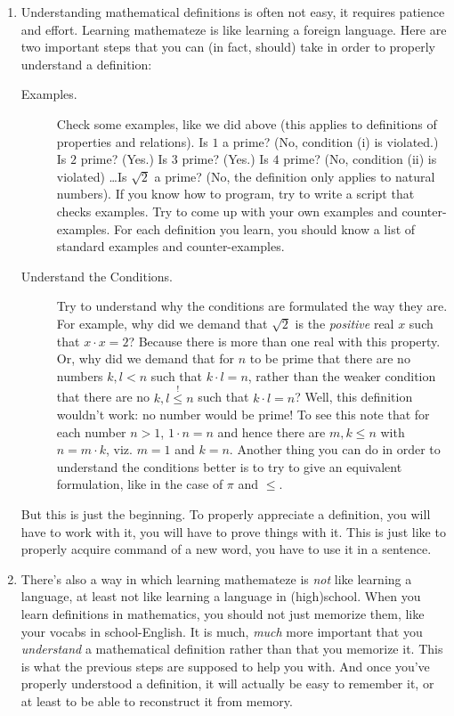 \begin{enumerate}[{\thesection}.1]
		\item Understanding mathematical definitions is often not easy, it requires patience and effort. Learning mathemateze is like learning a foreign language. Here are two important steps that you can (in fact, should) take in order to properly understand a definition:

		\begin{description}
		
			\item[Examples.] Check some examples, like we did above (this applies to definitions of properties and relations). Is $1$ a prime? (No, condition (i) is violated.) Is $2$ prime? (Yes.) Is $3$ prime? (Yes.) Is $4$ prime? (No, condition (ii) is violated) \dots Is $\sqrt{2}$ a prime? (No, the definition only applies to natural numbers). If you know how to program, try to write a script that checks examples. Try to come up with your own examples and counter-examples. For each definition you learn, you should know a list of standard examples and counter-examples.

			\item[Understand the Conditions.] Try to understand why the conditions are formulated the way they are. For example, why did we demand that $\sqrt{2}$ is the \emph{positive} real $x$ such that $x\cdot x=2$? Because there is more than one real with this property. Or, why did we demand that for $n$ to be prime that there are no numbers $k,l<n$ such that $k\cdot l=n$, rather than the weaker condition that there are no $k,l\overset{!}{\leq} n$ such that $k\cdot l=n$? Well, this definition wouldn't work: no number would be prime! To see this note that for each number $n>1$, $1\cdot n=n$ and hence there are $m,k\leq n$ with $n=m\cdot k$, viz. $m=1$ and $k=n$. Another thing you can do in order to understand the conditions better is to try to give an equivalent formulation, like in the case of $\pi$ and $\leq$. 
		
		\end{description}
		
		But this is just the beginning. To properly appreciate a definition, you will have to work with it, you will have to prove things with it. This is just like to properly acquire command of a new word, you have to use it in a sentence. 
		
		\item There's also a way in which learning mathemateze is \emph{not} like learning a language, at least not like learning a language in (high)school. When you learn definitions in mathematics, you should not just memorize them, like your vocabs in school-English. It is much, \emph{much} more important that you \emph{understand} a mathematical definition rather than that you memorize it. This is what the previous steps are supposed to help you with. And once you've properly understood a definition, it will actually be easy to remember it, or at least to be able to reconstruct it from memory.
		

\end{enumerate}
